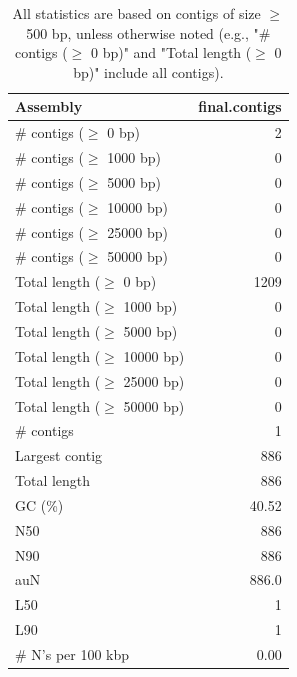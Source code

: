 \documentclass[12pt,a4paper]{article}
\begin{document}
\begin{table}[ht]
\begin{center}
\caption{All statistics are based on contigs of size $\geq$ 500 bp, unless otherwise noted (e.g., "\# contigs ($\geq$ 0 bp)" and "Total length ($\geq$ 0 bp)" include all contigs).}
\begin{tabular}{|l*{1}{|r}|}
\hline
Assembly & final.contigs \\ \hline
\# contigs ($\geq$ 0 bp) & 2 \\ \hline
\# contigs ($\geq$ 1000 bp) & 0 \\ \hline
\# contigs ($\geq$ 5000 bp) & 0 \\ \hline
\# contigs ($\geq$ 10000 bp) & 0 \\ \hline
\# contigs ($\geq$ 25000 bp) & 0 \\ \hline
\# contigs ($\geq$ 50000 bp) & 0 \\ \hline
Total length ($\geq$ 0 bp) & 1209 \\ \hline
Total length ($\geq$ 1000 bp) & 0 \\ \hline
Total length ($\geq$ 5000 bp) & 0 \\ \hline
Total length ($\geq$ 10000 bp) & 0 \\ \hline
Total length ($\geq$ 25000 bp) & 0 \\ \hline
Total length ($\geq$ 50000 bp) & 0 \\ \hline
\# contigs & 1 \\ \hline
Largest contig & 886 \\ \hline
Total length & 886 \\ \hline
GC (\%) & 40.52 \\ \hline
N50 & 886 \\ \hline
N90 & 886 \\ \hline
auN & 886.0 \\ \hline
L50 & 1 \\ \hline
L90 & 1 \\ \hline
\# N's per 100 kbp & 0.00 \\ \hline
\end{tabular}
\end{center}
\end{table}
\end{document}
